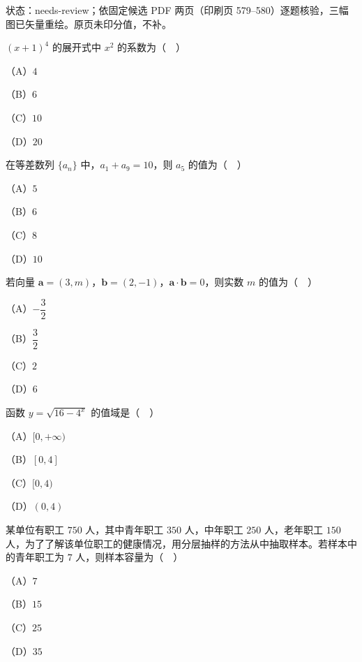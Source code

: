 状态：needs-review；依固定候选 PDF 两页（印刷页 579–580）逐题核验，三幅图已矢量重绘。原页未印分值，不补。
\begin{question}
$(x+1)^4$ 的展开式中 $x^2$ 的系数为（　）

（A）$4$

（B）$6$

（C）$10$

（D）$20$

\end{question}
\begin{question}
在等差数列 $\{a_n\}$ 中，$a_1+a_9=10$，则 $a_5$ 的值为（　）

（A）$5$

（B）$6$

（C）$8$

（D）$10$

\end{question}
\begin{question}
若向量 $\boldsymbol a=(3,m)$，$\boldsymbol b=(2,-1)$，$\boldsymbol a\cdot\boldsymbol b=0$，则实数 $m$ 的值为（　）

（A）$-\dfrac32$

（B）$\dfrac32$

（C）$2$

（D）$6$

\end{question}
\begin{question}
函数 $y=\sqrt{16-4^x}$ 的值域是（　）

（A）$[0,+\infty)$

（B）$[0,4]$

（C）$[0,4)$

（D）$(0,4)$

\end{question}
\begin{question}
某单位有职工 $750$ 人，其中青年职工 $350$ 人，中年职工 $250$ 人，老年职工 $150$ 人，为了了解该单位职工的健康情况，用分层抽样的方法从中抽取样本。若样本中的青年职工为 $7$ 人，则样本容量为（　）

（A）$7$

（B）$15$

（C）$25$

（D）$35$

\end{question}
